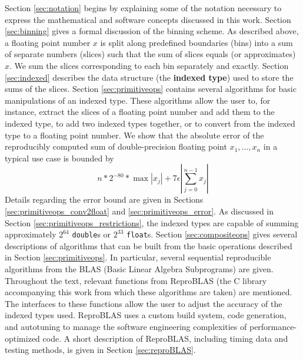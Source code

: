   Section \ref{sec:notation} begins by explaining some of the notation necessary to express the mathematical and software concepts discussed in this work.
  Section \ref{sec:binning} gives a formal discussion of the binning scheme. As described above, a floating point number $x$ is split along predefined boundaries (bins) into a sum of separate numbers (slices) such that the sum of slices equals (or approximates) $x$. We sum the slices corresponding to each bin separately and exactly.
  Section \ref{sec:indexed} describes the data structure (the \textbf{indexed type}) used to store the sums of the slices.
  Section \ref{sec:primitiveops} contains several algorithms for basic manipulations of an indexed type.  These algorithms allow the user to, for instance, extract the slices of a floating point number and add them to the indexed type, to add two indexed types together, or to convert from the indexed type to a floating point number. We show that the absolute error of the reproducibly computed sum of double-precision floating point $x_1, ..., x_n$ in a typical use case is bounded by
  \[
    n* 2^{-80} * \max|x_j| + 7 \epsilon|\sum\limits_{j = 0}^{n - 1} x_j|
  \]
  Details regarding the error bound are given in Sections \ref{sec:primitiveops_conv2float} and \ref{sec:primitiveops_error}.
  As discussed in Section \ref{sec:primitiveops_restrictions}, the indexed types are capable of summing approximately $2^{64}$ \texttt{double}s or $2^{33}$ \texttt{float}s.
  Section \ref{sec:compositeops} gives several descriptions of algorithms that can be built from the basic operations described in Section \ref{sec:primitiveops}. In particular, several sequential reproducible algorithms from the BLAS (Basic Linear Algebra Subprograms) are given.
  Throughout the text, relevant functions from ReproBLAS (the C library accompanying this work from which these algorithms are taken) are mentioned. The interfaces to these functions allow the user to adjust the accuracy of the indexed types used. ReproBLAS uses a custom build system, code generation, and autotuning to manage the software engineering complexities of performance-optimized code. A short description of ReproBLAS, including timing data and testing methods, is given in Section \ref{sec:reproBLAS}.
